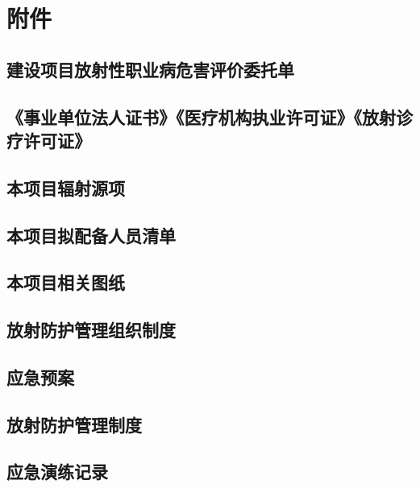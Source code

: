 \clearpage


\renewcommand{\thechapter}{}
\setcounter{chapter}{0}
\renewcommand{\thesection}{附件\arabic{section}}
\setcounter{section}{0}

\chapter*{附件}

\section{建设项目放射性职业病危害评价委托单}

\section{《事业单位法人证书》《医疗机构执业许可证》《放射诊疗许可证》}

\section{本项目辐射源项}

\section{本项目拟配备人员清单}

\section{本项目相关图纸}

\section{放射防护管理组织制度}

\section{应急预案}

\section{放射防护管理制度}

\section{应急演练记录}

